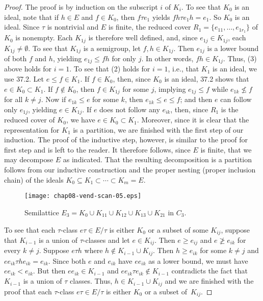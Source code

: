 \documentclass{surv-l}
\numberwithin{equation}{section}
\numberwithin{table}{section}
\numberwithin{figure}{section}
\theoremstyle{definition}
\begin{document}
\begin{proof} The proof is by induction on the subscript $i$ of $K_{i}$.
To see that $K_{0}$ is an ideal, note that if $h\in E$ and $f\in
K_{0}$, then $f\tau e_{1}$ yields $fh\tau e_{1}h=e_{1}$. So
$K_{0}$ is an ideal. Since $\tau$ is nontrivial and $E$ is finite,
the reduced cover $R_{1}= \{e_{11},\ldots, e_{1r_{1}}\}$ of
$K_{0}$ is nonempty. Each $K_{1j}$ is therefore well defined, and,
since $e_{1j}\in K_{1j}$, each $K_{1j}\neq\emptyset$. To see that
$K_{1j}$ is a semigroup, let $f, h\in K_{1j}$. Then $e_{1j}$ is a
lower bound of both $f$ and $h$, yielding $e_{1j}\leq fh$ for only
$j$. In other words, $fh\in K_{1j}$. Thus, (3) above holds for
$i=1$. To see that (2) holds for $i=1$, i.e., that $K_{1}$ is an
ideal, we use 37.2. Let $e\leq f\in K_{1}$. If $f\in K_{0}$, then,
since $K_{0}$ is an ideal, 37.2 shows that $e\in K_{0}\subset
K_{1}$. If $f\not\in K_{0}$, then $f\in K_{1j}$ for some $j$,
implying $e_{1j}\leq f$ while $e_{1k}\not\leq f$ for all $k\neq
j$. Now if $e_{1k}\leq e$ for some $k$, then $e_{1k}\leq e\leq f$;
and then $e$ can follow only $e_{1j}$, yielding $e\in K_{1j}$. If
$e$ does not follow any $e_{ik}$, then, since $R_{1}$ is the
reduced cover of $K_{0}$, we have $e\in K_{0}\subset K_{1}$.
Moreover, since it is clear that the representation for $K_{1}$ is
a partition, we are finished with the first step of our induction.
The proof of the inductive step, however, is similar to the proof
for first step and is left to the reader. It therefore follows,
since $E$ is finite, that we may decompose $E$ as indicated. That
the resulting decomposition is a partition follows from our
inductive construction and the proper nesting (proper inclusion
chain) of the ideals $K_{0}\subseteq K_{1}\subset\cdots\subset K_{m}=E$.

\setcounter{figure}{3}
\begin{figure}[!h]
\texttt{[image: chap08-vend-scan-05.eps]}
\caption{Semilattice $E_{3}=K_{0}\cup K_{11}\cup K_{12}\cup K_{13}\cup
K_{21}$ in $C_{3}$.\label{fig8.37.4}}
\end{figure}

To see that each $\tau$-class $e\tau\in E/\tau$ is either $K_{0}$
or a subset of some $K_{ij}$, suppose that $K_{i-1}$ is a union of
$\tau$-classes and let $e\in K_{ij}$. Then $e\geq e_{ij}$ and
$e\not\geq e_{ik}$ for every $k\neq j$. Suppose $e\tau h$ where
$h\not\in K_{i-1}\cup K_{ij}$. Then $h\geq e_{ik}$ for some $k\neq
j$ and $ee_{ik}\tau he_{ik}=e_{ik}$. Since both $e$ and $e_{ik}$
have $ee_{ik}$ as a lower bound, we must have $ee_{ik}<e_{ik}$.
But then $ee_{ik}\in K_{i-1}$ and $ee_{ik}\tau e_{ik}\not\in
K_{i-1}$ contradicts the fact that $K_{i-1}$ is a union of $\tau$
classes. Thus, $h\in K_{i-1}\cup K_{ij}$ and we are finished with
the proof that each $\tau$-class $ e\tau\in E/\tau$ is either
$K_{0}$ or a subset of~$K_{ij}$.


\end{proof}
\end{document}
